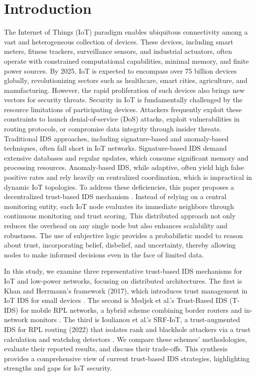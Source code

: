 \documentclass[final,5p,times,twocolumn]{elsarticle}
\begin{document}
\section{Introduction}
\label{introduction}

The Internet of Things (IoT) paradigm enables ubiquitous connectivity among a vast and heterogeneous collection of devices. These devices, including smart meters, fitness trackers, surveillance sensors, and industrial actuators, often operate with constrained computational capabilities, minimal memory, and finite power sources. By 2025, IoT is expected to encompass over 75 billion devices globally, revolutionizing sectors such as healthcare, smart cities, agriculture, and manufacturing. However, the rapid proliferation of such devices also brings new vectors for security threats.
Security in IoT is fundamentally challenged by the resource limitations of participating devices. Attackers frequently exploit these constraints to launch denial-of-service (DoS) attacks, exploit vulnerabilities in routing protocols, or compromise data integrity through insider threats. Traditional IDS approaches, including signature-based and anomaly-based techniques, often fall short in IoT networks. Signature-based IDS demand extensive databases and regular updates, which consume significant memory and processing resources. Anomaly-based IDS, while adaptive, often yield high false positive rates and rely heavily on centralized coordination, which is impractical in dynamic IoT topologies.
To address these deficiencies, this paper proposes a decentralized trust-based IDS mechanism \cite{Khan2017}. Instead of relying on a central monitoring entity, each IoT node evaluates its immediate neighbors through continuous monitoring and trust scoring. This distributed approach not only reduces the overhead on any single node but also enhances scalability and robustness. The use of subjective logic provides a probabilistic model to reason about trust, incorporating belief, disbelief, and uncertainty, thereby allowing nodes to make informed decisions even in the face of limited data.

In this study, we examine three representative trust-based IDS mechanisms for IoT and low-power networks, focusing on distributed architectures. The first is Khan and Herrmann’s framework (2017), which introduces trust management in IoT IDS for small devices \cite{Khan2017}. The second is Medjek et al.’s Trust-Based IDS (T-IDS) for mobile RPL networks, a hybrid scheme combining border routers and in-network monitors \cite{Medjek2017}. The third is Ioulianou et al.’s SRF-IoT, a trust-augmented IDS for RPL routing (2022) that isolates rank and blackhole attackers via a trust calculation and watchdog detectors \cite{Ioulianou2022}. We compare these schemes’ methodologies, evaluate their reported results, and discuss their trade-offs. This synthesis provides a comprehensive view of current trust-based IDS strategies, highlighting strengths and gaps for IoT security.
\end{document}
